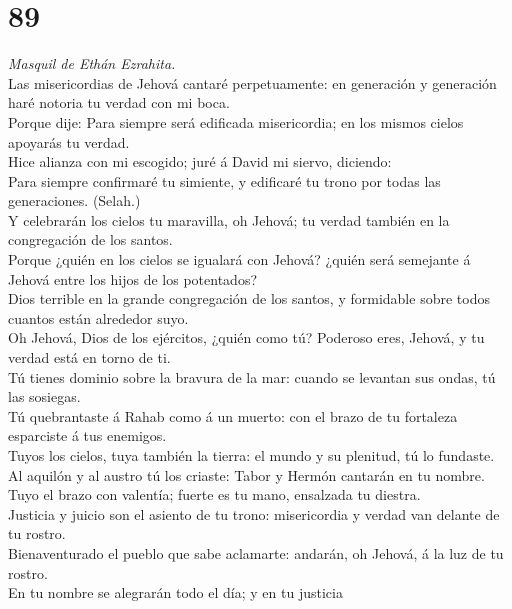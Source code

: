 \hypertarget{section-88}{%
\section{89}\label{section-88}}

 \emph{Masquil de Ethán Ezrahita.}\\
Las misericordias de Jehová cantaré perpetuamente: en generación y
generación haré notoria tu verdad con mi boca.\\
 Porque dije: Para siempre será edificada misericordia; en
los mismos cielos apoyarás tu verdad.\\
 Hice alianza con mi escogido; juré á David mi siervo,
diciendo:\\
 Para siempre confirmaré tu simiente, y edificaré tu trono
por todas las generaciones. (Selah.)\\
 Y celebrarán los cielos tu maravilla, oh Jehová; tu verdad
también en la congregación de los santos.\\
 Porque ¿quién en los cielos se igualará con Jehová? ¿quién
será semejante á Jehová entre los hijos de los potentados?\\
 Dios terrible en la grande congregación de los santos, y
formidable sobre todos cuantos están alrededor suyo.\\
 Oh Jehová, Dios de los ejércitos, ¿quién como tú? Poderoso
eres, Jehová, y tu verdad está en torno de ti.\\
 Tú tienes dominio sobre la bravura de la mar: cuando se
levantan sus ondas, tú las sosiegas.\\
 Tú quebrantaste á Rahab como á un muerto: con el brazo de
tu fortaleza esparciste á tus enemigos.\\
 Tuyos los cielos, tuya también la tierra: el mundo y su
plenitud, tú lo fundaste.\\
 Al aquilón y al austro tú los criaste: Tabor y Hermón
cantarán en tu nombre.\\
 Tuyo el brazo con valentía; fuerte es tu mano, ensalzada
tu diestra.\\
 Justicia y juicio son el asiento de tu trono: misericordia
y verdad van delante de tu rostro.\\
 Bienaventurado el pueblo que sabe aclamarte: andarán, oh
Jehová, á la luz de tu rostro.\\
 En tu nombre se alegrarán todo el día; y en tu justicia
